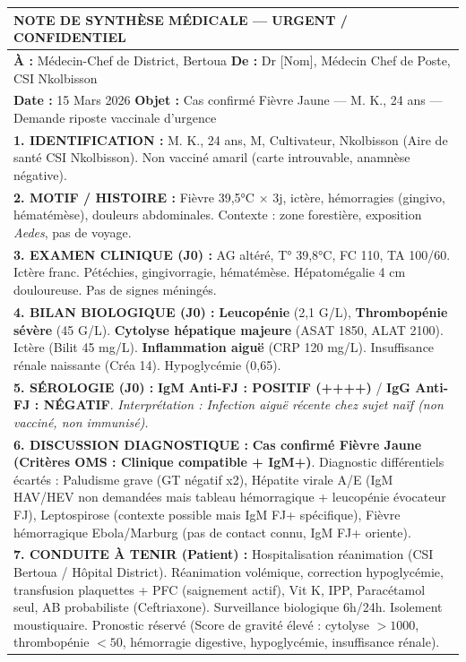 \documentclass[11pt]{article}
\begin{document}
\begin{center}
\begin{tabularx}{\linewidth}{|X|}\hline
\rowcolor{popblueL} \textbf{NOTE DE SYNTHÈSE MÉDICALE — URGENT / CONFIDENTIEL} \\ \hline
\textbf{À :} Médecin-Chef de District, Bertoua \hfill \textbf{De :} Dr [Nom], Médecin Chef de Poste, CSI Nkolbisson \\
\textbf{Date :} 15 Mars 2026 \hfill \textbf{Objet :} Cas confirmé Fièvre Jaune — M. K., 24 ans — Demande riposte vaccinale d'urgence \\ \hline
\textbf{1. IDENTIFICATION :} M. K., 24 ans, M, Cultivateur, Nkolbisson (Aire de santé CSI Nkolbisson). Non vacciné amaril (carte introuvable, anamnèse négative). \\ \hline
\textbf{2. MOTIF / HISTOIRE :} Fièvre 39,5°C $\times$ 3j, ictère, hémorragies (gingivo, hématémèse), douleurs abdominales. Contexte : zone forestière, exposition \emph{Aedes}, pas de voyage. \\ \hline
\textbf{3. EXAMEN CLINIQUE (J0) :} AG altéré, T° 39,8°C, FC 110, TA 100/60. Ictère franc. Pétéchies, gingivorragie, hématémèse. Hépatomégalie 4 cm douloureuse. Pas de signes méningés. \\ \hline
\textbf{4. BILAN BIOLOGIQUE (J0) :} \textbf{Leucopénie} (2,1 G/L), \textbf{Thrombopénie sévère} (45 G/L). \textbf{Cytolyse hépatique majeure} (ASAT 1850, ALAT 2100). Ictère (Bilit 45 mg/L). \textbf{Inflammation aiguë} (CRP 120 mg/L). Insuffisance rénale naissante (Créa 14). Hypoglycémie (0,65). \\ \hline
\textbf{5. SÉROLOGIE (J0) :} \textbf{IgM Anti-FJ : POSITIF (++++)} / \textbf{IgG Anti-FJ : NÉGATIF}. \textit{Interprétation : Infection aiguë récente chez sujet naïf (non vacciné, non immunisé).} \\ \hline
\textbf{6. DISCUSSION DIAGNOSTIQUE :} \textbf{Cas confirmé Fièvre Jaune (Critères OMS : Clinique compatible + IgM+)}. Diagnostic différentiels écartés : Paludisme grave (GT négatif x2), Hépatite virale A/E (IgM HAV/HEV non demandées mais tableau hémorragique + leucopénie évocateur FJ), Leptospirose (contexte possible mais IgM FJ+ spécifique), Fièvre hémorragique Ebola/Marburg (pas de contact connu, IgM FJ+ oriente). \\ \hline
\textbf{7. CONDUITE À TENIR (Patient) :} Hospitalisation réanimation (CSI Bertoua / Hôpital District). Réanimation volémique, correction hypoglycémie, transfusion plaquettes + PFC (saignement actif), Vit K, IPP, Paracétamol seul, AB probabiliste (Ceftriaxone). Surveillance biologique 6h/24h. Isolement moustiquaire. Pronostic réservé (Score de gravité élevé : cytolyse $> 1000$, thrombopénie $< 50$, hémorragie digestive, hypoglycémie, insuffisance rénale). \\ \hline

\end{tabularx}
\end{center}
\end{document}
